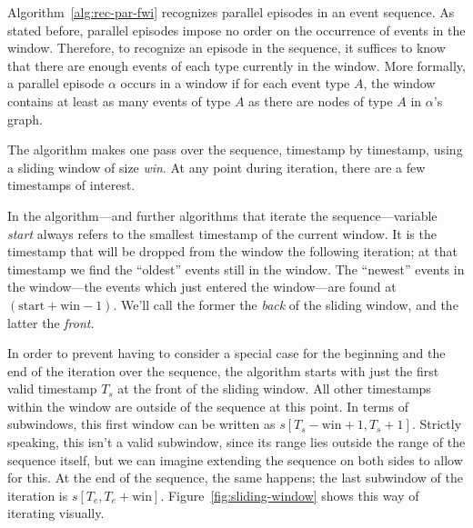 Algorithm~\ref{alg:rec-par-fwi} recognizes parallel episodes in an event sequence. As stated before, parallel episodes impose no order on the occurrence of events in the window. Therefore, to recognize an episode in the sequence, it suffices to know that there are enough events of each type currently in the window. More formally, a parallel episode $ \alpha $ occurs in a window if for each event type $ A $, the window contains at least as many events of type $ A $ as there are nodes of type $ A $ in $ \alpha $'s graph.

The algorithm makes one pass over the sequence, timestamp by timestamp, using a sliding window of size \emph{win}. At any point during iteration, there are a few timestamps of interest.

In the algorithm---and further algorithms that iterate the sequence---variable \emph{start} always refers to the smallest timestamp of the current window. It is the timestamp that will be dropped from the window the following iteration; at that timestamp we find the ``oldest'' events still in the window. The ``newest'' events in the window---the events which just entered the window---are found at $ (\text{start} + \text{win} - 1) $. We'll call the former the \emph{back} of the sliding window, and the latter the \emph{front}.

In order to prevent having to consider a special case for the beginning and the end of the iteration over the sequence, the algorithm starts with just the first valid timestamp $ T_s $ at the front of the sliding window. All other timestamps within the window are outside of the sequence at this point. In terms of subwindows, this first window can be written as $ s[T_s - \text{win} + 1, T_s + 1] $. Strictly speaking, this isn't a valid subwindow, since its range lies outside the range of the sequence itself, but we can imagine extending the sequence on both sides to allow for this. At the end of the sequence, the same happens; the last subwindow of the iteration is $ s[T_e, T_e + \text{win}] $. Figure~\ref{fig:sliding-window} shows this way of iterating visually.

